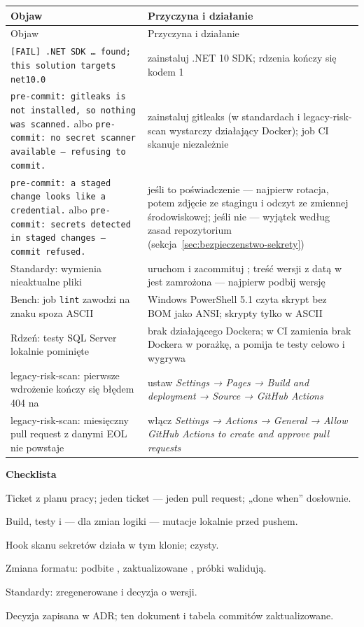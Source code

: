 \begin{xltabular}{\linewidth}{@{}>{\raggedright\arraybackslash}p{5.6cm} >{\raggedright\arraybackslash}X@{}}
\toprule
Objaw & Przyczyna i działanie \\
\midrule
\endfirsthead
\toprule
Objaw & Przyczyna i działanie \\
\midrule
\endhead
\texttt{[FAIL] .NET SDK \ldots{} found; this solution targets net10.0} & zainstaluj .NET 10 SDK;  rdzenia kończy się kodem 1 \\
\texttt{pre-commit: gitleaks is not installed, so nothing was scanned.} albo \texttt{pre-commit: no secret scanner available — refusing to commit.} & zainstaluj gitleaks (w standardach i legacy-risk-scan wystarczy działający Docker); job CI skanuje niezależnie \\
\texttt{pre-commit: a staged change looks like a credential.} albo \texttt{pre-commit: secrets detected in staged changes — commit refused.} & jeśli to poświadczenie --- najpierw rotacja, potem zdjęcie ze stagingu i odczyt ze zmiennej środowiskowej; jeśli nie --- wyjątek według zasad repozytorium (sekcja~\ref{sec:bezpieczenstwo-sekrety}) \\
Standardy:  wymienia nieaktualne pliki & uruchom  i zacommituj ; treść wersji z datą w  jest zamrożona --- najpierw podbij wersję \\
Bench: job \texttt{lint} zawodzi na znaku spoza ASCII & Windows PowerShell 5.1 czyta skrypt bez BOM jako ANSI; skrypty tylko w ASCII \\
Rdzeń: testy SQL Server lokalnie pominięte & brak działającego Dockera; w CI  zamienia brak Dockera w porażkę, a  pomija te testy celowo i wygrywa \\
legacy-risk-scan: pierwsze wdrożenie kończy się błędem 404 na  & ustaw \emph{Settings → Pages → Build and deployment → Source → GitHub Actions} \\
legacy-risk-scan: miesięczny pull request z danymi EOL nie powstaje & włącz \emph{Settings → Actions → General → Allow GitHub Actions to create and approve pull requests} \\
\bottomrule
\end{xltabular}

\textbf{Checklista}
\begin{checklista}
  \item Ticket z planu pracy; jeden ticket --- jeden pull request; „done when” dosłownie.
  \item Build, testy i --- dla zmian logiki --- mutacje lokalnie przed pushem.
  \item Hook skanu sekretów działa w tym klonie;  czysty.
  \item Zmiana formatu: podbite , zaktualizowane , próbki
        walidują.
  \item Standardy: zregenerowane  i decyzja o wersji.
  \item Decyzja zapisana w ADR; ten dokument i tabela commitów zaktualizowane.
\end{checklista}

